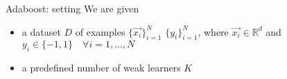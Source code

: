 \begin{frame}{Adaboost: setting}
We are given
\begin{itemize}
\item a dataset $D$ of examples $\{\vec{x_i}\}_{i=1}^N$ $\{y_i\}_{i=1}^N$, where $\vec{x_i} \in \mathbb{R}^d$ and $y_i \in \{-1, 1\}\quad\forall i=1,\ldots,N$ 
\item a predefined number of weak learners $K$
\end{itemize}
\end{frame}
